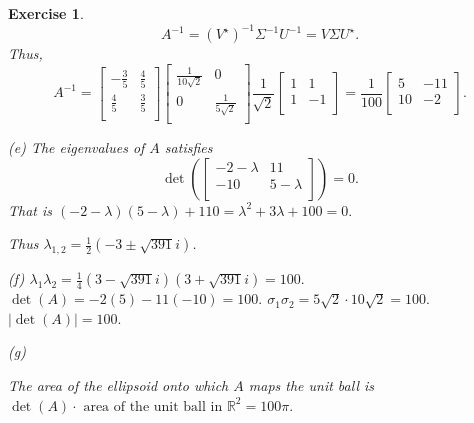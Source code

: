 \documentclass[paper=a4, fontsize=11pt]{scrartcl} %
\numberwithin{equation}{section} %
\numberwithin{figure}{section} %
\numberwithin{table}{section} %
\newtheorem{exercise}{Exercise}
\numberwithin{exercise}{section}
\begin{document}
\begin{exercise}
$$A^{-1}=(V^{\star})^{-1}\Sigma^{-1} U^{-1}=V\Sigma U^{\star}.$$
Thus, 
$$A^{-1}=\begin{bmatrix}
-\frac{3}{5}  & \frac{4}{5} \\
\frac{4}{5}  & \frac{3}{5} \\
\end{bmatrix}\begin{bmatrix}
\frac{1}{10\sqrt{2}} & 0 \\
0 & \frac{1}{5\sqrt{2}}\\
\end{bmatrix}  \frac{1}{\sqrt{2}}\begin{bmatrix}
1& 1 \\
1 & -1\\
\end{bmatrix} 
=\frac{1}{100}\begin{bmatrix}
5 &- 11 \\
10  & -2 \\
\end{bmatrix}.$$


(e) The eigenvalues of $A$ satisfies
$$ \det \left( \begin{bmatrix}
-2-\lambda & 11 \\
-10 & 5-\lambda \\
\end{bmatrix} \right) =0.$$
That is $(-2-\lambda)(5-\lambda)+110=\lambda^2+3\lambda+100=0.$

Thus $\lambda_{1,2}=\frac{1}{2}(-3\pm \sqrt{391} i )$.

(f)
$\lambda_1 \lambda_2=\frac{1}{4} (3-\sqrt{391} i)(3+\sqrt{391} i)=100.$ 
$\det(A)=-2(5)-11(-10)=100.$ 
 $\sigma_1 \sigma_2=5\sqrt{2} \cdot 10 \sqrt{2} =100.$  $ |\det(A)|=100.$
 
 (g)
 
 The area of the ellipsoid onto which $A$ maps the unit ball is  $\det(A) \cdot \mbox{ area of the unit ball in } \mathbb{R}^2=100\pi.$
\end{exercise}
\end{document}
